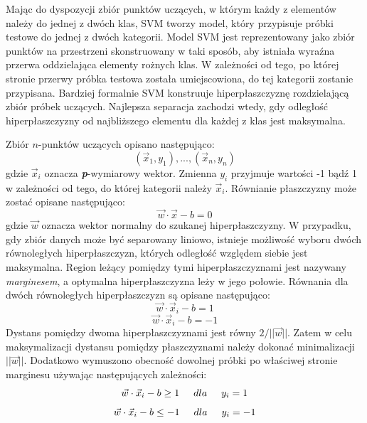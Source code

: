 Mając do dyspozycji zbiór punktów uczących, w którym każdy z elementów należy do jednej z dwóch klas, SVM tworzy model, który przypisuje próbki testowe do jednej z dwóch kategorii. Model SVM jest reprezentowany jako zbiór punktów na przestrzeni skonstruowany w taki sposób, aby istniała wyraźna przerwa oddzielająca elementy rożnych klas. W zależności od tego, po której stronie przerwy próbka testowa została umiejscowiona, do tej kategorii zostanie przypisana. Bardziej formalnie SVM konstruuje hiperpłaszczyznę rozdzielającą zbiór próbek uczących. Najlepsza separacja zachodzi wtedy, gdy odległość hiperpłaszczyzny od najbliższego elementu dla każdej z klas jest maksymalna. 

Zbiór $n$-punktów uczących opisano następująco:
\begin{equation}
(\vec{x}_1,y_1), ..., (\vec{x}_n,y_n)
\end{equation}
gdzie $\vec{x}_i$ oznacza \textit{\textbf{p}}-wymiarowy wektor. Zmienna $y_i$ przyjmuje wartości -1 bądź 1 w zależności od tego, do której kategorii należy $\vec{x}_i$. Równianie płaszczyzny może zostać opisane następująco:
\begin{equation}
\vec{w}\cdot \vec{x} - b = 0
\end{equation}
gdzie $\vec{w}$ oznacza wektor normalny do szukanej hiperpłaszczyzny. W przypadku, gdy zbiór danych może być separowany liniowo, istnieje możliwość wyboru dwóch równoległych hiperpłaszczyzn, których odległość względem siebie jest maksymalna. Region leżący pomiędzy tymi hiperpłaszczyznami jest nazywany \textit{marginesem}, a optymalna hiperpłaszczyzna leży w jego połowie. Równania dla dwóch równoległych hiperpłaszczyzn są opisane następująco:
\begin{equation}
\vec{w}\cdot \vec{x}_i - b = 1
\end{equation}
\begin{equation}
\vec{w}\cdot \vec{x}_i - b = -1
\end{equation}
Dystans pomiędzy dwoma hiperpłaszczyznami jest równy $2 /||\vec{w}||$. Zatem w celu maksymalizacji dystansu pomiędzy płaszczyznami należy dokonać minimalizacji $||\vec{w}||$. Dodatkowo wymuszono obecność dowolnej próbki po właściwej stronie marginesu używając następujących zależności:
\begin{equation}
\vec{w}\cdot \vec{x}_i - b \geq 1 \hspace{0.5cm} dla \hspace{0.5cm} y_i = 1 
\end{equation}
\begin{equation}
\vec{w}\cdot \vec{x}_i - b \leq -1 \hspace{0.5cm} dla \hspace{0.5cm} y_i = -1
\end{equation}
